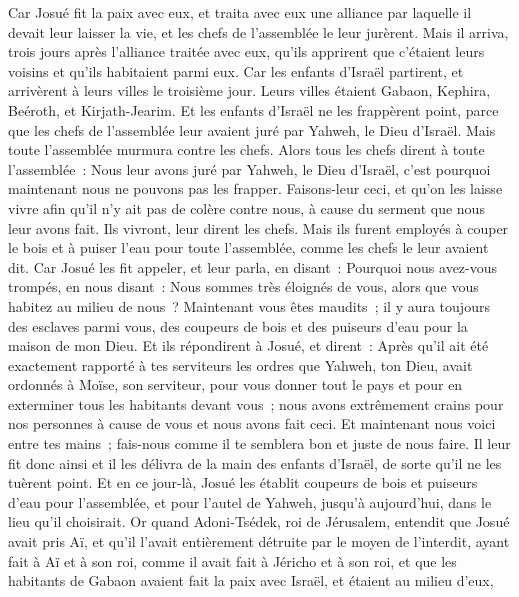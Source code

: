 \begin{multicols}{2}
Car Josué fit la paix avec eux, et traita avec eux une alliance par laquelle il devait leur laisser la vie, et les chefs de l'assemblée le leur jurèrent.
Mais il arriva, trois jours après l'alliance traitée avec eux, qu'ils apprirent que c'étaient leurs voisins et qu'ils habitaient parmi eux.
Car les enfants d'Israël partirent, et arrivèrent à leurs villes le troisième jour. Leurs villes étaient Gabaon, Kephira, Beéroth, et Kirjath-Jearim.
Et les enfants d'Israël ne les frappèrent point, parce que les chefs de l'assemblée leur avaient juré par Yahweh, le Dieu d'Israël. Mais toute l'assemblée murmura contre les chefs.
Alors tous les chefs dirent à toute l'assemblée~: Nous leur avons juré par Yahweh, le Dieu d'Israël, c'est pourquoi maintenant nous ne pouvons pas les frapper.
Faisons-leur ceci, et qu'on les laisse vivre afin qu'il n'y ait pas de colère contre nous, à cause du serment que nous leur avons fait.
Ils vivront, leur dirent les chefs. Mais ils furent employés à couper le bois et à puiser l'eau pour toute l'assemblée, comme les chefs le leur avaient dit.
Car Josué les fit appeler, et leur parla, en disant~: Pourquoi nous avez-vous trompés, en nous disant~: Nous sommes très éloignés de vous, alors que vous habitez au milieu de nous~?
Maintenant vous êtes maudits~; il y aura toujours des esclaves parmi vous, des coupeurs de bois et des puiseurs d'eau pour la maison de mon Dieu.
Et ils répondirent à Josué, et dirent~: Après qu'il ait été exactement rapporté à tes serviteurs les ordres que Yahweh, ton Dieu, avait ordonnés à Moïse, son serviteur, pour vous donner tout le pays et pour en exterminer tous les habitants devant vous~; nous avons extrêmement crains pour nos personnes à cause de vous et nous avons fait ceci. 
Et maintenant nous voici entre tes mains~; fais-nous comme il te semblera bon et juste de nous faire.
Il leur fit donc ainsi et il les délivra de la main des enfants d'Israël, de sorte qu'il ne les tuèrent point.
Et en ce jour-là, Josué les établit coupeurs de bois et puiseurs d'eau pour l'assemblée, et pour l'autel de Yahweh, jusqu'à aujourd'hui, dans le lieu qu'il choisirait.
\VerseOne{}Or quand Adoni-Tsédek, roi de Jérusalem, entendit que Josué avait pris Aï, et qu'il l'avait entièrement détruite par le moyen de l'interdit, ayant fait à Aï et à son roi, comme il avait fait à Jéricho et à son roi, et que les habitants de Gabaon avaient fait la paix avec Israël, et étaient au milieu d'eux,

\end{multicols}
